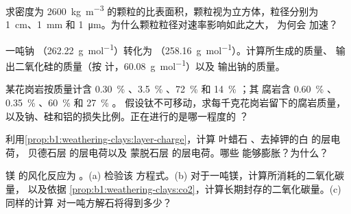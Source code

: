 \begin{exercise}[$\star\star$]\label{exo:b1:weathering-clays:5}
求密度为
\qty{2600}{kg.m^{-3}} 的颗粒的比表面积，颗粒视为立方体，粒径分别为 \qty{1}{cm}、\qty{1}{mm}
和 \qty{1}{\micro m}。为什么颗粒粒径对速率影响如此之大，
为何会
加速？
\end{exercise}

\begin{exercise}[$\star\star$]\label{exo:b1:weathering-clays:6}
一吨钠 （\qty{262.22}{g.mol^{-1}}）转化为
（\qty{258.16}{g.mol^{-1}}）。计算所生成的质量、
输出二氧化硅的质量（按  计，\qty{60.08}{g.mol^{-1}}）以及
输出钠的质量。
\end{exercise}

\begin{exercise}[$\star\star$]\label{exo:b1:weathering-clays:7}
某花岗岩按质量计含 \qty{0.30}{\percent} 、\qty{3.5}{\percent}
、\qty{72}{\percent}  和 \qty{14}{\percent} ；其
腐岩含 \qty{0.60}{\percent} 、\qty{0.35}{\percent}
、\qty{60}{\percent}  和 \qty{27}{\percent} 。
假设钛不可移动，求每千克花岗岩留下的腐岩质量，
以及钠、硅和铝的损失比例。正在进行的是哪一程度的
？
\end{exercise}

\begin{exercise}[$\star\star$]\label{exo:b1:weathering-clays:8}
利用\cref{prop:b1:weathering-clays:layer-charge}，计算
叶蜡石 、去掉钾的白  的层电荷，
贝德石层  的层电荷以及
蒙脱石层  的层电荷。哪些
能够膨胀？为什么？
\end{exercise}

\begin{exercise}[$\star\star$]\label{exo:b1:weathering-clays:9}
镁  的风化反应为
。(a) 检验该
方程式。(b) 对于一吨镁，计算所消耗的二氧化碳量，
以及依据
\cref{prop:b1:weathering-clays:co2}，计算长期封存的二氧化碳量。(c) 同样的计算
对一吨方解石将得到多少？
\end{exercise}

